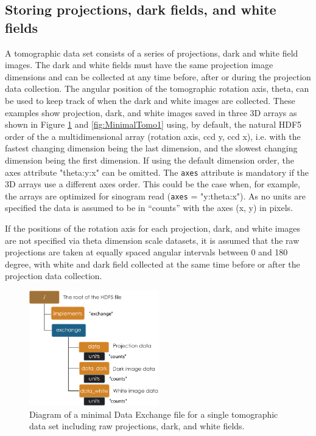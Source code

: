 \subsection{Storing projections, dark fields, and white fields}
\label{section:minimalTomo}

A tomographic data set consists of a series of projections, dark and white field images. The dark and white fields must have the same projection image dimensions and can be collected at any time before, after or during the projection data collection. The angular position of the tomographic rotation axis, theta, can be used to keep track of when the dark and white images are collected.  These examples show projection, dark, and white images saved in three 3D arrays as shown in Figure \ref{fig:MinimalTomo0} and \ref{fig:MinimalTomo1} using, by default, the natural HDF5 order of the a multidimensional array (rotation axis, ccd y, ccd x), i.e. with the fastest changing dimension being the last dimension, and the slowest changing dimension being the first dimension. If using the default dimension order, the axes attribute "theta:y:x" can be omitted. The {\tt{axes}} attribute is mandatory if the 3D arrays use a different axes order. This could be the case when, for example, the arrays are optimized for sinogram read ({\tt{axes}} = "y:theta:x"). As no units are specified the data is assumed to be in ``counts'' with the axes (x, y) in pixels. 

If the positions of the rotation axis for each projection, dark, and white images are not specified via theta dimension scale datasets, it is assumed that the raw projections are taken at equally spaced angular intervals between 0 and 180 degree, with white and dark field collected at the same time before or after the projection data collection.

\begin{figure}[h!]
\centering
\includegraphics[width=0.5\textwidth]{figures/dx_MinimalTomo0.pdf}
\caption{Diagram of a minimal Data Exchange file for a single tomographic data set including raw projections, dark, and white fields.}
\label{fig:MinimalTomo0}
\end{figure}

